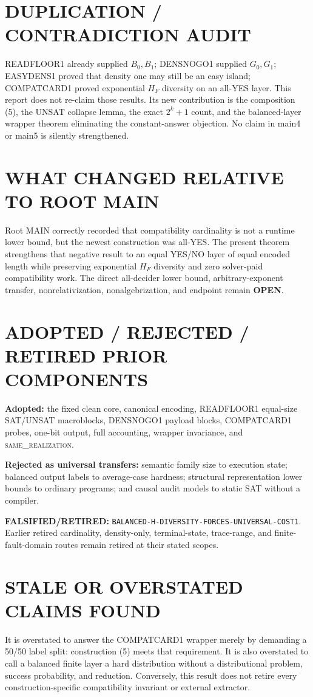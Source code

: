 \documentclass[11pt]{article}
\newcommand{\OPEN}{\textbf{OPEN}}
\newcommand{\same}{\textsc{same\_realization}}
\begin{document}
\section{DUPLICATION / CONTRADICTION AUDIT}
READFLOOR1 already supplied \(B_0,B_1\); DENSNOGO1 supplied \(G_0,G_1\);
EASYDENS1 proved that density one may still be an easy island; COMPATCARD1
proved exponential \(H_F\) diversity on an all-YES layer.  This report does
not re-claim those results.  Its new contribution is the composition (5), the
UNSAT collapse lemma, the exact \(2^k+1\) count, and the balanced-layer wrapper
theorem eliminating the constant-answer objection.  No claim in main4 or
main5 is silently strengthened.

\section{WHAT CHANGED RELATIVE TO ROOT MAIN}
Root MAIN correctly recorded that compatibility cardinality is not a runtime
lower bound, but the newest construction was all-YES.  The present theorem
strengthens that negative result to an equal YES/NO layer of equal encoded
length while preserving exponential \(H_F\) diversity and zero solver-paid
compatibility work.  The direct all-decider lower bound, arbitrary-exponent
transfer, nonrelativization, nonalgebrization, and endpoint remain \OPEN.

\section{ADOPTED / REJECTED / RETIRED PRIOR COMPONENTS}
\textbf{Adopted:} the fixed clean core, canonical encoding, READFLOOR1
equal-size SAT/UNSAT macroblocks, DENSNOGO1 payload blocks, COMPATCARD1 probes,
one-bit output, full accounting, wrapper invariance, and \same{}.

\textbf{Rejected as universal transfers:} semantic family size to execution
state; balanced output labels to average-case hardness; structural
representation lower bounds to ordinary programs; and causal audit models to
static SAT without a compiler.

\textbf{FALSIFIED/RETIRED:}
\texttt{BALANCED-H-DIVERSITY-FORCES-UNIVERSAL-COST1}.  Earlier retired
cardinality, density-only, terminal-state, trace-range, and finite-fault-domain
routes remain retired at their stated scopes.

\section{STALE OR OVERSTATED CLAIMS FOUND}
It is overstated to answer the COMPATCARD1 wrapper merely by demanding a 50/50
label split: construction (5) meets that requirement.  It is also overstated
to call a balanced finite layer a hard distribution without a distributional
problem, success probability, and reduction.  Conversely, this result does
not retire every construction-specific compatibility invariant or external
extractor.
\end{document}
